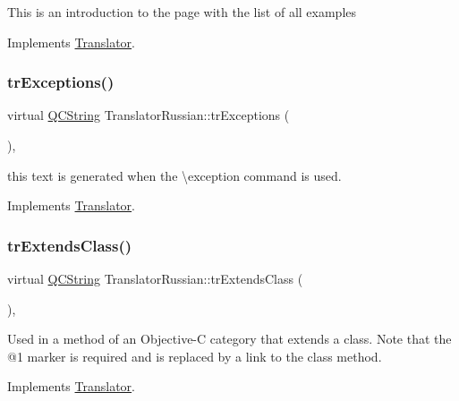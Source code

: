 This is an introduction to the page with the list of all examples 

Implements \mbox{\hyperlink{class_translator}{Translator}}.

\mbox{\label{class_translator_russian_a90c7c3e8224e277a71bd8b32586aa410}} 
\subsubsection{\texorpdfstring{trExceptions()}{trExceptions()}}
{\footnotesize\ttfamily virtual \mbox{\hyperlink{class_q_c_string}{Q\+C\+String}} Translator\+Russian\+::tr\+Exceptions (\begin{DoxyParamCaption}{ }\end{DoxyParamCaption})\hspace{0.3cm}{\ttfamily [inline]}, {\ttfamily [virtual]}}

this text is generated when the \textbackslash{}exception command is used. 

Implements \mbox{\hyperlink{class_translator}{Translator}}.

\mbox{\label{class_translator_russian_af7e40586c185d8feac621fe3409b4870}} 
\subsubsection{\texorpdfstring{trExtendsClass()}{trExtendsClass()}}
{\footnotesize\ttfamily virtual \mbox{\hyperlink{class_q_c_string}{Q\+C\+String}} Translator\+Russian\+::tr\+Extends\+Class (\begin{DoxyParamCaption}{ }\end{DoxyParamCaption})\hspace{0.3cm}{\ttfamily [inline]}, {\ttfamily [virtual]}}

Used in a method of an Objective-\/C category that extends a class. Note that the @1 marker is required and is replaced by a link to the class method. 

Implements \mbox{\hyperlink{class_translator}{Translator}}.

\mbox{\label{class_translator_russian_aafa58df73b93c3f5dd87d05daf995b91}} 
